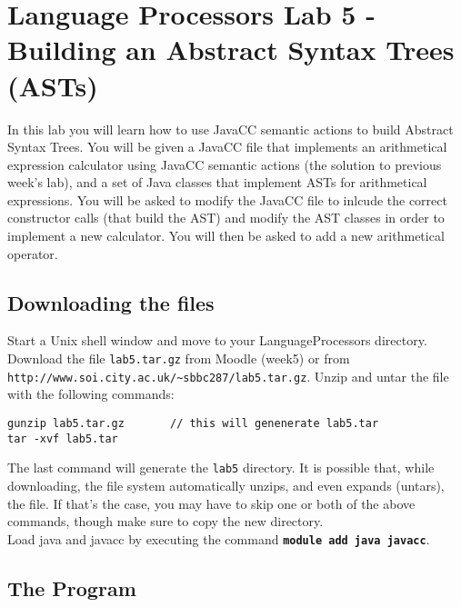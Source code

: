 \documentclass{article}
\begin{document}
\thispagestyle{empty}

\newcommand{\negra}[1]{\textbf{#1}}

\section*{Language Processors Lab 5 - Building an Abstract Syntax Trees (ASTs)}

\medskip\noindent In this lab you will learn how to use JavaCC semantic actions to build Abstract Syntax Trees. You will be given a JavaCC file that implements an arithmetical expression calculator using JavaCC semantic actions (the solution to previous week's lab), and a set of Java classes that implement ASTs for arithmetical expressions. You will be asked to modify the JavaCC file to inlcude the correct constructor calls (that build the AST) and modify the AST classes in order to implement a new calculator. You will then be asked to add a new arithmetical operator.

\subsection*{Downloading the files}

Start a Unix shell window and move to your LanguageProcessors directory. Download the file {\tt lab5.tar.gz} from Moodle (week5) or from \verb+http://www.soi.city.ac.uk/~sbbc287/lab5.tar.gz+. Unzip and untar the file with the following commands:

\begin{verbatim}
gunzip lab5.tar.gz       // this will genenerate lab5.tar
tar -xvf lab5.tar
\end{verbatim}

The last command will generate the {\tt lab5} directory. It is possible that, while downloading, the file system automatically unzips, and even expands (untars), the file. If that's the case, you may have to skip one or both of the above commands, though make sure to copy the new directory. \\
Load java and javacc by executing the command 
{\textbf {\tt module add java javacc}}.


\subsection*{The Program}
\end{document}
